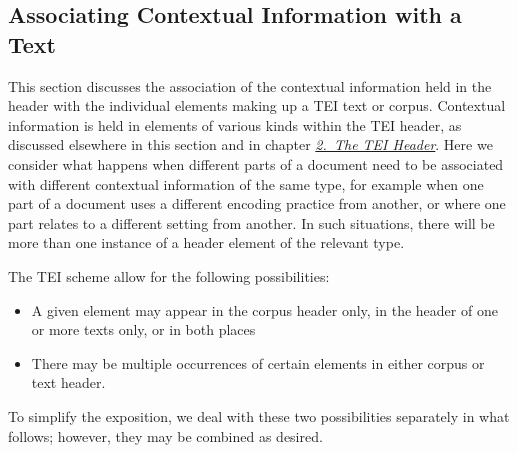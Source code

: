 \subsection[{Associating Contextual Information with a Text}]{Associating Contextual Information with a Text}\label{CCAS}\par
This section discusses the association of the contextual information held in the header with the individual elements making up a TEI text or corpus. Contextual information is held in elements of various kinds within the TEI header, as discussed elsewhere in this section and in chapter \textit{\hyperref[HD]{2.\ The TEI Header}}. Here we consider what happens when different parts of a document need to be associated with different contextual information of the same type, for example when one part of a document uses a different encoding practice from another, or where one part relates to a different setting from another. In such situations, there will be more than one instance of a header element of the relevant type.\par
The TEI scheme allow for the following possibilities: \begin{itemize}
\item A given element may appear in the corpus header only, in the header of one or more texts only, or in both places
\item There may be multiple occurrences of certain elements in either corpus or text header.
\end{itemize} \par
To simplify the exposition, we deal with these two possibilities separately in what follows; however, they may be combined as desired. 
